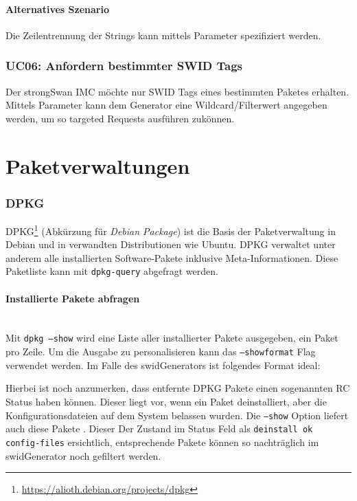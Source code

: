 \paragraph{Alternatives Szenario}
Die Zeilentrennung der Strings kann mittels Parameter spezifiziert werden.

\subsubsection{UC06: Anfordern bestimmter SWID Tags}
Der strongSwan IMC möchte nur SWID Tags eines bestimmten Paketes erhalten.
Mittels Parameter kann dem Generator eine Wildcard/Filterwert angegeben werden, um so targeted Requests ausführen zukönnen.


\section{Paketverwaltungen}

\subsubsection{DPKG}

DPKG\footnote{\url{https://alioth.debian.org/projects/dpkg}} (Abkürzung für
\textit{Debian Package}) ist die Basis der Paketverwaltung in Debian und in
verwandten Distributionen wie Ubuntu. DPKG verwaltet unter anderem alle
installierten Software-Pakete inklusive Meta-Informationen. Diese Paketliste
kann mit \texttt{dpkg-query} abgefragt werden.

\paragraph{Installierte Pakete abfragen} \hspace{0pt} \\

\noindent Mit \texttt{dpkg ---show} wird eine Liste aller installierter Pakete
ausgegeben, ein Paket pro Zeile. Um die Ausgabe zu personalisieren kann das
\texttt{---showformat} Flag verwendet werden. Im Falle des swidGenerators
ist folgendes Format ideal:


\noindent Hierbei ist noch anzumerken, dass entfernte DPKG Pakete einen sogenannten RC Status haben können. Dieser liegt vor, wenn ein Paket deinstalliert, aber die Konfigurationsdateien auf dem System belassen wurden. Die \texttt{---show} Option liefert auch diese Pakete . Dieser Der Zustand im Status Feld als \texttt{deinstall ok config-files} ersichtlich, entsprechende Pakete können so nachträglich im swidGenerator noch gefiltert werden.
